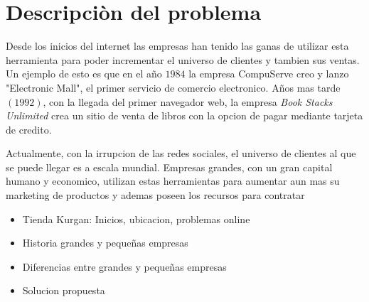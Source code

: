 \section{Descripciòn del problema}




Desde los inicios del internet las empresas han tenido las ganas de utilizar esta herramienta para poder 
incrementar el universo de clientes y tambien sus ventas. Un ejemplo de esto es que en el año $1984$ 
la empresa CompuServe creo y lanzo "Electronic Mall", el primer servicio de comercio electronico\cite{Def:1}. 
Años mas tarde$(1992)$, con la llegada del primer navegador web, la empresa \emph{Book Stacks Unlimited}
 crea un sitio de venta de libros con la opcion de pagar mediante tarjeta de credito.

Actualmente, con la irrupcion de las redes sociales, el universo de clientes al que se puede llegar es a escala 
mundial. Empresas grandes, con un gran capital humano y economico, utilizan estas herramientas para aumentar
aun mas su marketing de productos y ademas poseen los recursos para contratar 




\begin{itemize}

\item Tienda Kurgan: Inicios, ubicacion, problemas online
\item Historia grandes y pequeñas empresas
\item Diferencias entre grandes y pequeñas empresas
\item Solucion propuesta


\end{itemize}




